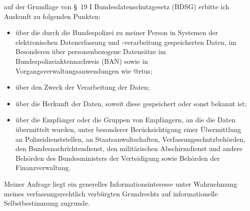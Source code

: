auf der Grundlage von §~19 I Bundesdatenschutzgesetz (BDSG) erbitte ich Auskunft
zu folgenden Punkten:

\begin{itemize}
  \item über die durch die Bundespolizei zu meiner Person in Systemen der
  elektronischen Datenerfassung und -verarbeitung gespeicherten Daten, im
  Besonderen über personenbezogene Datensätze im Bundespolizeiaktennachweis (BAN)
  sowie in Vorgangsverwaltungsanwendungen wie @rtus;

  \item über den Zweck der Verarbeitung der Daten;

  \item über die Herkunft der Daten, soweit diese gespeichert oder sonst bekannt
  ist;

  \item über die Empfänger oder die Gruppen von Empfängern, an die die Daten
  übermittelt wurden, unter besonderer Berücksichtigung einer Übermittlung an
  Polizeidienststellen, an Staatsanwaltschaften, Verfassungsschutzbehörden, den
  Bundesnachrichtendienst, den militärischen Abschirmdienst und andere Behörden
  des Bundesministers der Verteidigung sowie Behörden der Finanzverwaltung.
\end{itemize}

Meiner Anfrage liegt ein generelles Informationsinteresse unter Wahrnehmung
meines verfassungsrechtlich verbürgten Grundrechts auf informationelle
Selbstbestimmung zugrunde.